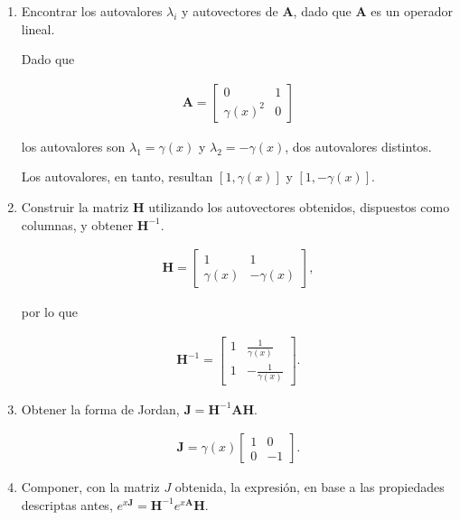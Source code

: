 \begin{enumerate}
	\item Encontrar los autovalores $\lambda_i$ y autovectores de $\textbf{A}$, dado que $\textbf{A}$ es un operador lineal.
	
	Dado que
	
	\begin{align}
	\textbf{A} = 
	\begin{bmatrix}
	0 & 1 \\
	\gamma(x)^2 & 0
	\end{bmatrix}
	\end{align}
	
	los autovalores son $\lambda_1 = \gamma(x)$ y $\lambda_2 = -\gamma(x)$, dos autovalores distintos.
	
	Los autovalores, en tanto, resultan $[1,\gamma(x)]$ y $[1,-\gamma(x)]$.
	
	\item Construir la matriz $\textbf{H}$ utilizando los autovectores obtenidos, dispuestos como columnas, y obtener $\textbf{H}^{-1}$.
	
	\begin{align}
	\textbf{H} = 
	\begin{bmatrix}
	1 & 1 \\
	\gamma(x) & -\gamma(x)
	\end{bmatrix},
	\end{align}
	
	por lo que
	
	\begin{align}
	\textbf{H}^{-1} = 
	\begin{bmatrix}
	1 & \frac{1}{\gamma(x)} \\
	1 & -\frac{1}{\gamma(x)}
	\end{bmatrix}.
	\end{align}	
	
	\item Obtener la forma de Jordan, $\textbf{J} = \textbf{H}^{-1} \textbf{A} \textbf{H}$.
	
	\begin{align}
	\textbf{J} = \gamma(x) 
	\begin{bmatrix}
	1 & 0 \\
	0 & -1
	\end{bmatrix}.
	\end{align}
	
	\item Componer, con la matriz $J$ obtenida, la expresión, en base a las propiedades descriptas antes, $e^{x\textbf{J}} = \textbf{H}^{-1} e^{x\textbf{A}} \textbf{H}$.
	

\end{enumerate}
